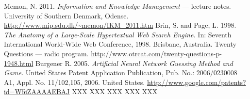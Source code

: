 \documentclass[a4paper]{article}
\begin{document}
\begin{thebibliography}{10}
Memon, N. 2011. \textsl{Information and Knowledge Management} --- lecture notes. University of Southern Denmark, Odense. \url{http://www.mip.sdu.dk/~memon/IKM_2011.htm}
 Brin, S. and Page, L. 1998. \textsl{The Anatomy of a Large-Scale Hypertextual Web Search Engine.} In: Seventh International World-Wide Web Conference, 1998. Brisbane, Australia.
Twenty Questions --- radio program. \url{http://www.otrcat.com/twenty-questions-p-1948.html}
Burgener R. 2005. \textsl{Artificial Neural Network Guessing Method and Game.} United States Patent Application Publication, Pub. No.: 2006/0230008 A1, Appl. No. 11/102,105, 2006. United States. \url{http://www.google.com/patents?id=W5iZAAAAEBAJ}
XXX
XXX
XXX
XXX
XXX
\end{thebibliography}
\end{document}
